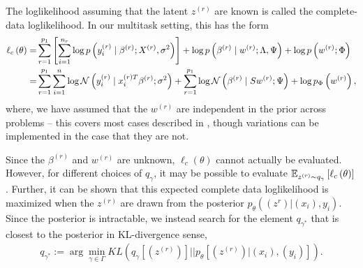 \documentclass[14pt]{extarticle}
\begin{document}
The loglikelihood assuming that the latent $z^{(r)}$ are known is called the
complete-data loglikelihood. In our multitask setting, this has the form
\begin{align*}
  \ell_{c}\left(\theta\right) = &\sum_{r = 1}^{p_{1}}\left[\sum_{i = 1}^{n_{r}} \log p\left(y_{i}^{(r)} \mid \beta^{(r)} ; X^{(r)}, \sigma^{2}\right)\right] + \log p\left(\beta^{(r)} \mid w^{(r)}; \Lambda, \Psi\right) + \log p\left(w^{(r)}; \Phi\right) \\
  = &\sum_{r = 1}^{p_{1}}\sum_{i = 1}^{n} \log \mathcal{N}\left(y_{i}^{(r)} \mid x_{i}^{(r) T}\beta^{(r)}; \sigma^{2}\right) + \sum_{r = 1}^{p_{1}}\log \mathcal{N}\left(\beta^{(r)} \mid S w^{(r)}; \Psi\right) + \log p_{\Phi}\left(w^{(r)}\right),
\end{align*}
where, we have assumed that the $w^{(r)}$ are independent in the prior across
problems -- this covers most cases described in \citep{zhang2005learning},
though variations can be implemented in the case that they are not.

Since the $\beta^{(r)}$ and $w^{(r)}$ are unknown, $\ell_{c}\left(\theta\right)$
cannot actually be evaluated. However, for different choices of $q_{\gamma}$, it
may be possible to evaluate $\mathbb{E}_{z^{(r)} \sim
  q_{\gamma}}\left[{\ell_{c}\left(\theta\right)}\right]$. Further, it can be shown that this
expected complete data loglikelihood is maximized when the $z^{(r)}$ are drawn
from the posterior $p_{\theta}\left(\left(z^{r}\right) \vert \left(x_{i}\right),
y_{i}\right)$. Since the posterior is intractable, we instead search for the
element $q_{\gamma^{\ast}}$ that is closest to the posterior in KL-divergence
sense,
\begin{align*}
q_{\gamma^{\ast}}:= \arg\min_{\gamma \in \Gamma} KL\left(q_{\gamma}\left[\left(z^{(r)}\right)\right] \vert \vert
p_{\theta}\left[\left(z^{(r)}\right) \vert \left(x_{i}\right), \left(y_{i}\right)\right]\right).
\end{align*}
\end{document}
